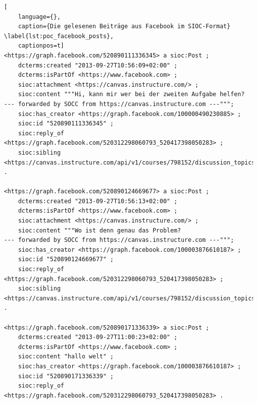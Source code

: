 \begin{lstlisting}[
    language={},
    caption={Die gelesenen Beiträge aus Facebook im SIOC-Format} \label{lst:poc_facebook_posts},
    captionpos=t]
<https://graph.facebook.com/520890111336345> a sioc:Post ;
    dcterms:created "2013-09-27T10:56:09+02:00" ;
    dcterms:isPartOf <https://www.facebook.com> ;
    sioc:attachment <https://canvas.instructure.com/> ;
    sioc:content """Hi, kann mir wer bei der zweiten Aufgabe helfen?
--- forwarded by SOCC from https://canvas.instructure.com ---""";
    sioc:has_creator <https://graph.facebook.com/100000490230885> ;
    sioc:id "520890111336345" ;
    sioc:reply_of <https://graph.facebook.com/520312298060793_520417398050283> ;
    sioc:sibling <https://canvas.instructure.com/api/v1/courses/798152/discussion_topics/1540697/entries/3284842> .

<https://graph.facebook.com/520890124669677> a sioc:Post ;
    dcterms:created "2013-09-27T10:56:13+02:00" ;
    dcterms:isPartOf <https://www.facebook.com> ;
    sioc:attachment <https://canvas.instructure.com/> ;
    sioc:content """Wo ist denn genau das Problem?
--- forwarded by SOCC from https://canvas.instructure.com ---""";
    sioc:has_creator <https://graph.facebook.com/100003876610187> ;
    sioc:id "520890124669677" ;
    sioc:reply_of <https://graph.facebook.com/520312298060793_520417398050283> ;
    sioc:sibling <https://canvas.instructure.com/api/v1/courses/798152/discussion_topics/1540697/entries/3284844> .

<https://graph.facebook.com/520890171336339> a sioc:Post ;
    dcterms:created "2013-09-27T11:00:23+02:00" ;
    dcterms:isPartOf <https://www.facebook.com> ;
    sioc:content "hallo welt" ;
    sioc:has_creator <https://graph.facebook.com/100003876610187> ;
    sioc:id "520890171336339" ;
    sioc:reply_of <https://graph.facebook.com/520312298060793_520417398050283> .
\end{lstlisting}

\wrapfill


